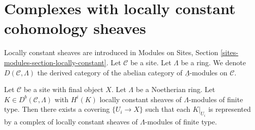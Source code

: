 \section{Complexes with locally constant cohomology sheaves}
\label{section-locally-constant}

\noindent
Locally constant sheaves are introduced in
Modules on Sites, Section \ref{sites-modules-section-locally-constant}.
Let $\mathcal{C}$ be a site.
Let $\Lambda$ be a ring.
We denote $D(\mathcal{C}, \Lambda)$ the derived category of the
abelian category of $\underline{\Lambda}$-modules on $\mathcal{C}$.

\begin{lemma}
\label{lemma-locally-constant}
Let $\mathcal{C}$ be a site with final object $X$.
Let $\Lambda$ be a Noetherian ring.
Let $K \in D^b(\mathcal{C}, \Lambda)$
with $H^i(K)$ locally constant sheaves of $\Lambda$-modules
of finite type. Then there exists a covering $\{U_i \to X\}$
such that each $K|_{U_i}$ is represented by
a complex of locally constant sheaves of $\Lambda$-modules
of finite type.
\end{lemma}

